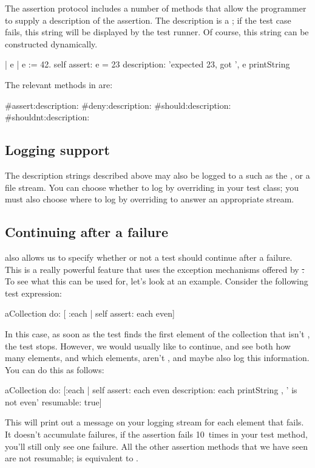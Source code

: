 \documentclass[a4paper,10pt,twoside]{book}
\begin{document}
The  assertion protocol includes a
number of methods that allow the programmer to supply a description of the assertion.  The description is a ; if the test case
fails, this string will be displayed by the test runner.  Of
course, this string can be constructed dynamically.
\begin{code}{}
| e |
e := 42.
self assert: e = 23
	description: 'expected 23, got ', e printString
\end{code}

The relevant methods in  are:
\begin{code}{}
#assert:description:
#deny:description:
#should:description:
#shouldnt:description:
\end{code}

\subsection{Logging support}
The description strings described above may also be logged to a
 such as the , or a file stream.
You can choose whether to log by overriding
 in your test class; you must also choose where
to log by overriding  to answer an appropriate stream.

\subsection{Continuing after a failure}
\sunit also allows us to specify whether or not a test should continue after a failure.  This is a really
powerful feature that uses the exception mechanisms offered
by \st.  To see what this can be used for, let's look at an
example. Consider the following test expression:
\begin{code}{}
aCollection do: [ :each | self assert: each even]
\end{code}
In this case, as soon as the test finds the first element of the collection that isn't
, the test stops. 
However, we would usually like to
continue, and see both how many elements, and which elements, aren't
, and maybe also log this information.  You can do this
as follows:
\begin{code}{}
aCollection do:
	[:each |
	self
		assert: each even
		description: each printString , ' is not even'
		resumable: true]
\end{code}
This will print out a message on your logging stream for each element
that fails.  It doesn't accumulate failures, \ie if the assertion
fails 10~times in your test method, you'll still only see one failure.
All the other assertion methods that we have seen are not resumable;
 is equivalent to .
\end{document}
